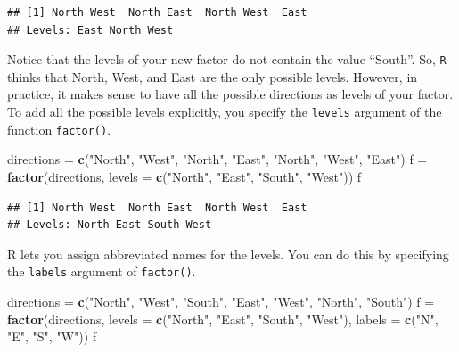 \documentclass[
]{book}
\newenvironment{Shaded}{\begin{snugshade}}{\end{snugshade}}
\newcommand{\DataTypeTok}[1]{\textcolor[rgb]{0.13,0.29,0.53}{#1}}
\newcommand{\KeywordTok}[1]{\textcolor[rgb]{0.13,0.29,0.53}{\textbf{#1}}}
\newcommand{\NormalTok}[1]{#1}
\newcommand{\StringTok}[1]{\textcolor[rgb]{0.31,0.60,0.02}{#1}}
\begin{document}
\begin{verbatim}
## [1] North West  North East  North West  East 
## Levels: East North West
\end{verbatim}

Notice that the levels of your new factor do not contain the value ``South''. So, \texttt{R} thinks that North, West, and East are the only possible levels. However, in practice, it makes sense to have all the possible directions as levels of your factor. To add all the possible levels explicitly, you specify the \texttt{levels} argument of the function \texttt{factor()}.

\begin{Shaded}
\begin{Highlighting}[]
\NormalTok{directions =}\StringTok{ }\KeywordTok{c}\NormalTok{(}\StringTok{"North"}\NormalTok{, }\StringTok{"West"}\NormalTok{, }\StringTok{"North"}\NormalTok{, }\StringTok{"East"}\NormalTok{, }\StringTok{"North"}\NormalTok{, }\StringTok{"West"}\NormalTok{, }\StringTok{"East"}\NormalTok{)}
\NormalTok{f =}\StringTok{ }\KeywordTok{factor}\NormalTok{(directions,}
            \DataTypeTok{levels =} \KeywordTok{c}\NormalTok{(}\StringTok{"North"}\NormalTok{, }\StringTok{"East"}\NormalTok{, }\StringTok{"South"}\NormalTok{, }\StringTok{"West"}\NormalTok{))}
\NormalTok{f}
\end{Highlighting}
\end{Shaded}

\begin{verbatim}
## [1] North West  North East  North West  East 
## Levels: North East South West
\end{verbatim}

R lets you assign abbreviated names for the levels. You can do this by specifying the \texttt{labels} argument of \texttt{factor()}.

\begin{Shaded}
\begin{Highlighting}[]
\NormalTok{directions =}\StringTok{ }\KeywordTok{c}\NormalTok{(}\StringTok{"North"}\NormalTok{, }\StringTok{"West"}\NormalTok{, }\StringTok{"South"}\NormalTok{, }\StringTok{"East"}\NormalTok{, }\StringTok{"West"}\NormalTok{, }\StringTok{"North"}\NormalTok{, }\StringTok{"South"}\NormalTok{)}
\NormalTok{f =}\StringTok{ }\KeywordTok{factor}\NormalTok{(directions,}
            \DataTypeTok{levels =} \KeywordTok{c}\NormalTok{(}\StringTok{"North"}\NormalTok{, }\StringTok{"East"}\NormalTok{, }\StringTok{"South"}\NormalTok{, }\StringTok{"West"}\NormalTok{),}
            \DataTypeTok{labels =} \KeywordTok{c}\NormalTok{(}\StringTok{"N"}\NormalTok{, }\StringTok{"E"}\NormalTok{, }\StringTok{"S"}\NormalTok{, }\StringTok{"W"}\NormalTok{))}
\NormalTok{f}
\end{Highlighting}
\end{Shaded}
\end{document}
